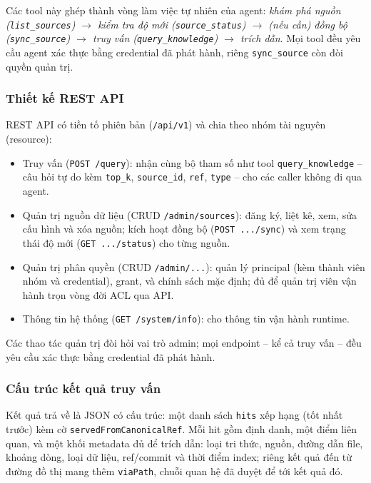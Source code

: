 Các tool này ghép thành vòng làm việc tự nhiên của agent: \textit{khám phá nguồn (\texttt{list\_sources}) $\rightarrow$ kiểm tra độ mới (\texttt{source\_status}) $\rightarrow$ (nếu cần) đồng bộ (\texttt{sync\_source}) $\rightarrow$ truy vấn (\texttt{query\_knowledge}) $\rightarrow$ trích dẫn}. Mọi tool đều yêu cầu agent xác thực bằng credential đã phát hành, riêng \texttt{sync\_source} còn đòi quyền quản trị.

\subsubsection{Thiết kế REST API}

REST API có tiền tố phiên bản (\texttt{/api/v1}) và chia theo nhóm tài nguyên (resource):

\begin{itemize}
  \item Truy vấn (\texttt{POST /query}): nhận cùng bộ tham số như tool \texttt{query\_knowledge} -- câu hỏi tự do kèm \texttt{top\_k}, \texttt{source\_id}, \texttt{ref}, \texttt{type} -- cho các caller không đi qua agent.
  \item Quản trị nguồn dữ liệu (CRUD \texttt{/admin/sources}): đăng ký, liệt kê, xem, sửa cấu hình và xóa nguồn; kích hoạt đồng bộ (\texttt{POST .../sync}) và xem trạng thái độ mới (\texttt{GET .../status}) cho từng nguồn.
  \item Quản trị phân quyền (CRUD \texttt{/admin/...}): quản lý principal (kèm thành viên nhóm và credential), grant, và chính sách mặc định; đủ để quản trị viên vận hành trọn vòng đời ACL qua API.
  \item Thông tin hệ thống (\texttt{GET /system/info}): cho thông tin vận hành runtime.
\end{itemize}

Các thao tác quản trị đòi hỏi vai trò admin; mọi endpoint -- kể cả truy vấn -- đều yêu cầu xác thực bằng credential đã phát hành.

\subsubsection{Cấu trúc kết quả truy vấn}

Kết quả trả về là JSON có cấu trúc: một danh sách \texttt{hits} xếp hạng (tốt nhất trước) kèm cờ \texttt{servedFromCanonicalRef}. Mỗi hit gồm định danh, một điểm liên quan, và một khối metadata đủ để trích dẫn: loại tri thức, nguồn, đường dẫn file, khoảng dòng, loại dữ liệu, ref/commit và thời điểm index; riêng kết quả đến từ đường đồ thị mang thêm \texttt{viaPath}, chuỗi quan hệ đã duyệt để tới kết quả đó.

